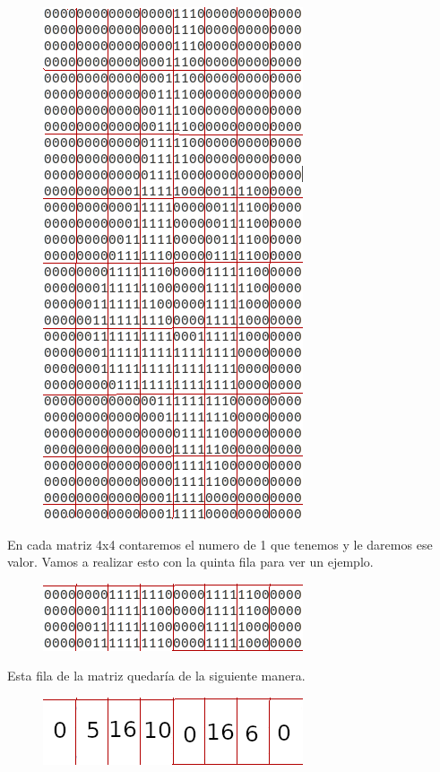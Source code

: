 \documentclass[titlepage]{article}
\begin{document}
	\begin{figure}[H]
		\centering
			\includegraphics[width=0.7\linewidth, height=0.72\textheight]{4matriculado}

	\end{figure}
	\newpage
	En cada matriz 4x4 contaremos el numero de 1 que tenemos y le daremos ese valor. Vamos a realizar esto con la quinta fila para ver un ejemplo. 
	\begin{figure}[H]
		\centering
		\includegraphics[width=0.7\linewidth]{columanasinmodificar}
	\end{figure}
	Esta fila de la matriz quedaría de la siguiente manera.
	\begin{figure}[H]
		\centering
		\includegraphics[width=0.7\linewidth]{columanmodificada}
		\caption{}
		\label{fig:columanmodificada}
	\end{figure}
	
\end{document}
